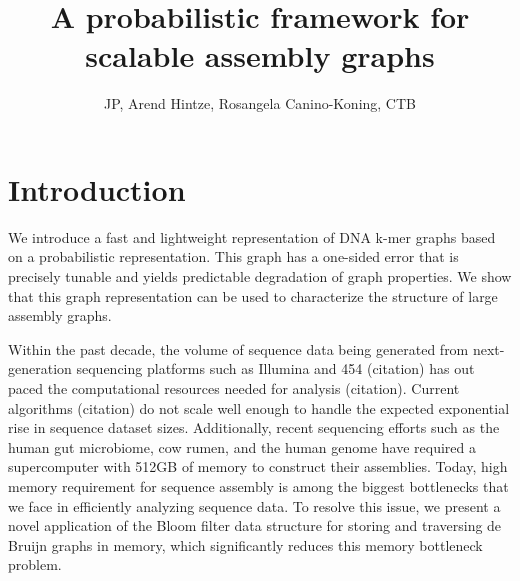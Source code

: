 \documentclass[12pt]{article} \usepackage{simplemargins}
\begin{document}
\title{A probabilistic framework for scalable assembly graphs}
\author{JP, Arend Hintze, Rosangela Canino-Koning, CTB}

\maketitle

\section{Introduction}

We introduce a fast and lightweight representation of DNA k-mer graphs
based on a probabilistic representation.  This graph has a one-sided
error that is precisely tunable and yields predictable degradation of
graph properties.  We show that this graph representation can be used
to characterize the structure of large assembly graphs.

Within the past decade, the volume of sequence data being generated
from next-generation sequencing platforms such as Illumina and 454
(citation) has out paced the computational resources needed for
analysis (citation). Current algorithms (citation) do not scale well
enough to handle the expected exponential rise in sequence dataset
sizes. Additionally, recent sequencing efforts such as the human gut
microbiome\cite{pmid20203603}, cow rumen\cite{pmid21273488}, and the 
human genome\cite{pmid21187386} have required a
supercomputer with 512GB of memory to construct their
assemblies. Today, high memory requirement for sequence assembly is
among the biggest bottlenecks that we face in efficiently analyzing
sequence data. To resolve this issue, we present a novel application
of the Bloom filter data structure\cite{bloom} for storing and traversing de
Bruijn graphs in memory, which significantly reduces this
memory bottleneck problem.
\end{document}

